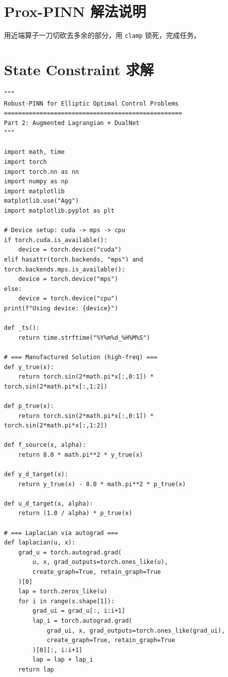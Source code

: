\documentclass[UTF8, 12pt]{ctexart}
\begin{document}
\section{Prox-PINN 解法说明}
\label{sec:prox-pinn}

用近端算子一刀切砍去多余的部分，用 \texttt{clamp} 锁死，完成任务。


\section{State Constraint 求解}
\label{sec:state-constraint}

\begin{tcolorbox}[
  title={State Constraint 完整代码},
  breakable,
  colback=white,
  colframe=black!60,
  fonttitle=\bfseries\small,
]
\begin{lstlisting}
"""
Robust-PINN for Elliptic Optimal Control Problems
==================================================
Part 2: Augmented Lagrangian + DualNet
"""

import math, time
import torch
import torch.nn as nn
import numpy as np
import matplotlib
matplotlib.use("Agg")
import matplotlib.pyplot as plt

# Device setup: cuda -> mps -> cpu
if torch.cuda.is_available():
    device = torch.device("cuda")
elif hasattr(torch.backends, "mps") and torch.backends.mps.is_available():
    device = torch.device("mps")
else:
    device = torch.device("cpu")
print(f"Using device: {device}")

def _ts():
    return time.strftime("%Y%m%d_%H%M%S")

# === Manufactured Solution (high-freq) ===
def y_true(x):
    return torch.sin(2*math.pi*x[:,0:1]) * torch.sin(2*math.pi*x[:,1:2])

def p_true(x):
    return torch.sin(2*math.pi*x[:,0:1]) * torch.sin(2*math.pi*x[:,1:2])

def f_source(x, alpha):
    return 8.0 * math.pi**2 * y_true(x)

def y_d_target(x):
    return y_true(x) - 8.0 * math.pi**2 * p_true(x)

def u_d_target(x, alpha):
    return (1.0 / alpha) * p_true(x)

# === Laplacian via autograd ===
def laplacian(u, x):
    grad_u = torch.autograd.grad(
        u, x, grad_outputs=torch.ones_like(u),
        create_graph=True, retain_graph=True
    )[0]
    lap = torch.zeros_like(u)
    for i in range(x.shape[1]):
        grad_ui = grad_u[:, i:i+1]
        lap_i = torch.autograd.grad(
            grad_ui, x, grad_outputs=torch.ones_like(grad_ui),
            create_graph=True, retain_graph=True
        )[0][:, i:i+1]
        lap = lap + lap_i
    return lap


\end{lstlisting}
\end{tcolorbox}
\end{document}
